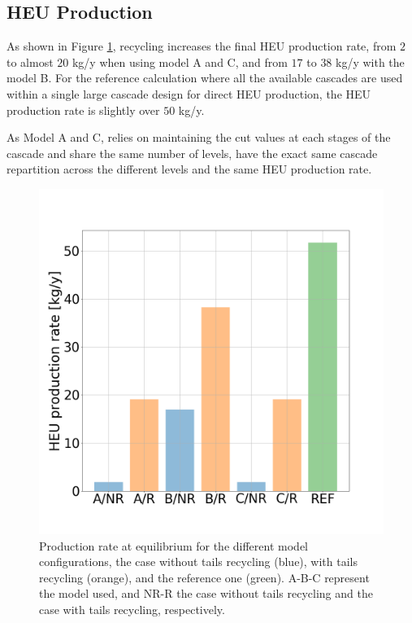\subsection{\gls{HEU} Production}

As shown in Figure \ref{fig:HEU_rate}, recycling increases the final \gls{HEU}
production rate, from $2$ to almost $20$ kg/y when using model A and C, and from
$17$ to $38$ kg/y with the model B. For the reference calculation where all the
available cascades are used within a single large cascade design for direct
\gls{HEU} production, the \gls{HEU} production rate is slightly over $50$ kg/y.


As Model A and C, relies on maintaining the cut values at each stages of the
cascade and share the same number of levels, have the exact same cascade
repartition across the different levels and the same \gls{HEU} production rate.

\begin{figure}[h!] %
    \centering
    \includegraphics[scale=0.25]{HEU_prod_rate}
    \caption{Production rate at equilibrium for the different model
        configurations, the case without tails recycling (blue), with tails
        recycling (orange), and the reference one (green). A-B-C represent
        the model used, and NR-R the case without tails recycling and the case
        with tails recycling, respectively.}
    \label{fig:HEU_rate}
\end{figure}
